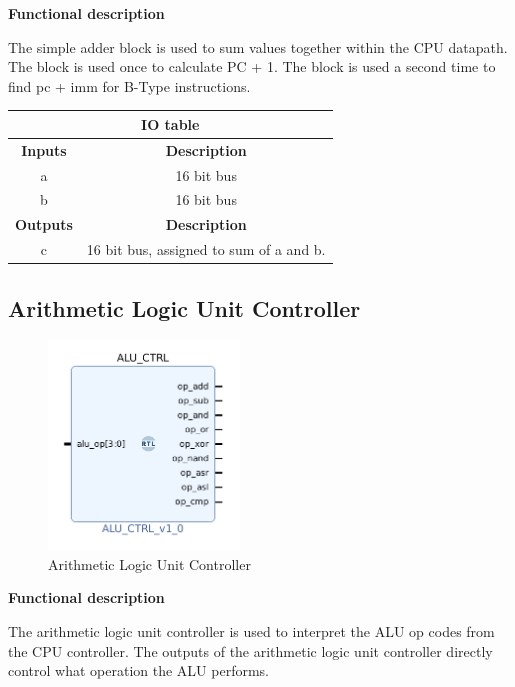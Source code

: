 \documentclass{article}
\begin{document}
\begin{par}
	\textbf{Functional description}
	\begin{par}
		The simple adder block is used to sum values together within the CPU datapath. The block is used once to calculate PC + 1. The block is used a second time to find pc + imm for B-Type instructions. 
	\end{par}
	
	\begin{center}
		\begin{tabular}{|c|c|}
			\hline 
			\multicolumn{2}{|c|}{\textbf{IO table}} \\
			\hline 
			\textbf{Inputs} & \textbf{Description} \\ 
			\hline 
			a & 16 bit bus \\ 
			\hline 
			b & 16 bit bus \\ 
			\hline 
			\textbf{Outputs} & \textbf{Description} \\ 
			\hline 
			c & 16 bit bus, assigned to sum of a and b. \\ 
			\hline 
		\end{tabular} 
	\end{center}

	\newpage

	\subsection{Arithmetic Logic Unit Controller}
	
	\begin{figure}[H]
		\centering
		\includegraphics[width=2in]{img/aluCtrl.png}
		\caption{Arithmetic Logic Unit Controller}
	\end{figure}

	\textbf{Functional description}
	\begin{par}
		The arithmetic logic unit controller is used to interpret the ALU op codes from the CPU controller. The outputs of the arithmetic logic unit controller directly control what operation the ALU performs. 
	\end{par}
	

\end{par}
\end{document}
